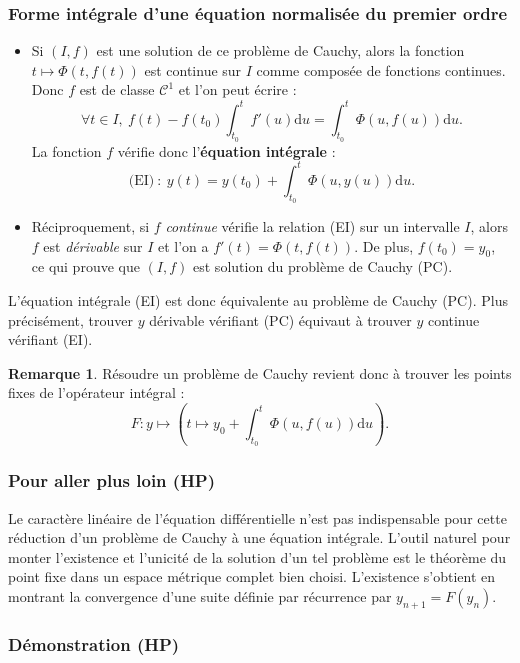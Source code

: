 \documentclass[french]{article}
\renewcommand{\d}{\text{d}}
\theoremstyle{plain}
\theoremstyle{definition}
\newtheorem*{rmq}{Remarque}
\theoremstyle{remark}
\begin{document}
\subsubsection*{Forme intégrale d'une équation normalisée du premier ordre}

\begin{itemize}
	\item Si $(I,f)$ est une solution de ce problème de Cauchy, alors la fonction $t\mapsto\Phi(t,f(t))$ est continue sur $I$ comme composée de fonctions continues. Donc $f$ est de classe $\mathcal{C}^1$ et l'on peut écrire :
	$$\forall t\in I,\ f(t)-f(t_0)\int_{t_0}^{t}f'(u)\d u=\int_{t_0}^{t}\Phi(u,f(u))\d u.$$
	La fonction $f$ vérifie donc l'\textbf{équation intégrale} :
	$$\text{(EI)}\ :\ y(t)=y(t_0)+\int_{t_0}^{t}\Phi(u,y(u))\d u.$$
	\item Réciproquement, si $f$ \textit{continue} vérifie la relation (EI) sur un intervalle $I$, alors $f$ est \textit{dérivable} sur $I$ et l'on a $f'(t)=\Phi(t,f(t))$. De plus, $f(t_0)=y_0$, ce qui prouve que $(I,f)$ est solution du problème de Cauchy (PC).
\end{itemize}

L'équation intégrale (EI) est donc équivalente au problème de Cauchy (PC). Plus précisément, trouver $y$ dérivable vérifiant (PC) équivaut à trouver $y$ continue vérifiant (EI).

\begin{rmq}
	Résoudre un problème de Cauchy revient donc à trouver les points fixes de l'opérateur intégral :
	$$F:y\mapsto\left(t\mapsto y_0+\int_{t_0}^{t}\Phi(u,f(u))\d u\right).$$
\end{rmq}

\subsubsection*{Pour aller plus loin (HP)}

Le caractère linéaire de l'équation différentielle n'est pas indispensable pour cette réduction d'un problème de Cauchy à une équation intégrale. L'outil naturel pour monter l'existence et l'unicité de la solution d'un tel problème est le théorème du point fixe dans un espace métrique complet bien choisi. L'existence s'obtient en montrant la convergence d'une suite définie par récurrence par $y_{n+1}=F(y_n)$.

\subsubsection*{Démonstration (HP)}
\end{document}

